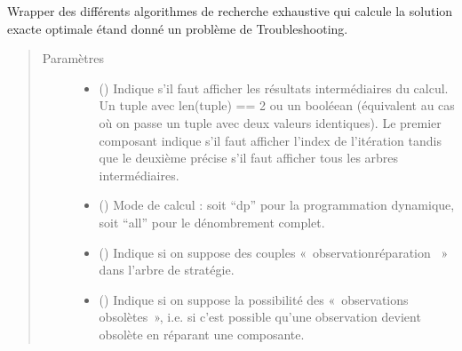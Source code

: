 \documentclass[letterpaper,10pt,french]{sphinxmanual}
\begin{document}
\begin{fulllineitems}
\begin{fulllineitems}
\label{\detokenize{index:DecisionTheoreticTroubleshooting.TroubleShootingProblem.brute_force_solver}}
Wrapper des différents algorithmes de recherche exhaustive qui calcule
la solution exacte optimale étand donné un problème de Troubleshooting.
\begin{quote}\begin{description}
\item[{Paramètres}] \leavevmode\begin{itemize}
\item {} 
 (\sphinxstyleliteralemphasis{\sphinxupquote{, }}) \textendash{} Indique s’il faut afficher les résultats intermédiaires du calcul.
Un tuple avec len(tuple) == 2 ou un booléean (équivalent au cas où
on passe un tuple avec deux valeurs identiques). Le premier
composant indique s’il faut afficher l’index de l’itération tandis
que le deuxième précise s’il faut afficher tous les arbres
intermédiaires.

\item {} 
 (\sphinxstyleliteralemphasis{\sphinxupquote{, }}) \textendash{} Mode de calcul : soit “dp” pour la programmation dynamique, soit
“all” pour le dénombrement complet.

\item {} 
 (\sphinxstyleliteralemphasis{\sphinxupquote{, }}) \textendash{} Indique si on suppose des couples « observation\sphinxhyphen{}réparation  » dans
l’arbre de stratégie.

\item {} 
 (\sphinxstyleliteralemphasis{\sphinxupquote{, }}) \textendash{} Indique si on suppose la possibilité des « observations obsolètes »,
i.e. si c’est possible qu’une observation devient obsolète en
réparant une composante.


\end{itemize}
\end{description}
\end{quote}
\end{fulllineitems}
\end{fulllineitems}
\end{document}
